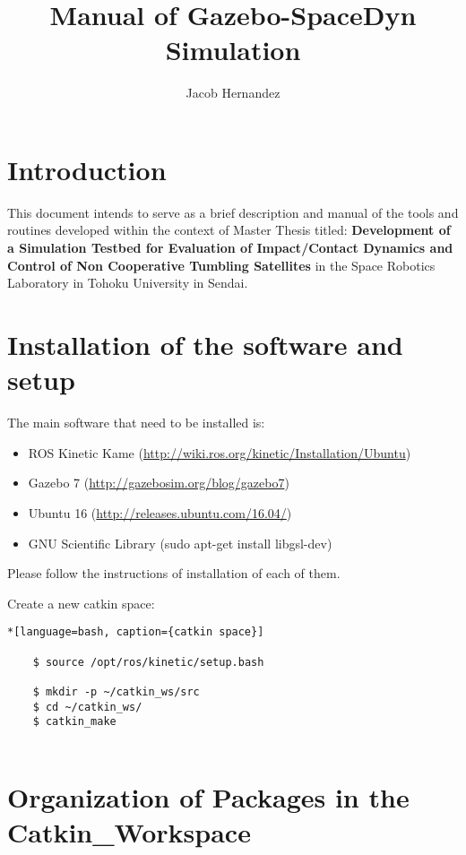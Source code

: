 \documentclass[11pt, twoside, a4paper]{report}
\title{Manual of Gazebo-SpaceDyn Simulation}
\author{Jacob Hernandez}
\begin{document}
\maketitle

\newpage

\begin{abstract}
\end{abstract}

\chapter{Introduction}

This document intends to serve as a brief description and manual of the tools and routines developed within the context of Master Thesis titled: \textbf{Development of a Simulation Testbed for Evaluation of Impact/Contact Dynamics and Control of Non Cooperative Tumbling Satellites} in the Space Robotics Laboratory in Tohoku University in Sendai.

\chapter{Installation of the software and setup}

The main software that need to be installed is:

\begin{itemize}
	\item ROS Kinetic Kame (\url{http://wiki.ros.org/kinetic/Installation/Ubuntu})
	\item Gazebo 7 (\url{http://gazebosim.org/blog/gazebo7})
	\item Ubuntu 16 (\url{http://releases.ubuntu.com/16.04/})
	\item GNU Scientific Library (sudo apt-get install libgsl-dev)
\end{itemize}

Please follow the instructions of installation of each of them. 

Create a new catkin space:
	
	\begin{lstlisting}*[language=bash, caption={catkin space}]
	
	$ source /opt/ros/kinetic/setup.bash
	
	$ mkdir -p ~/catkin_ws/src
	$ cd ~/catkin_ws/
	$ catkin_make		
	
	\end{lstlisting}

	


\chapter{Organization of Packages in the Catkin\_Workspace}\label{catkinws}
	
\end{document}
